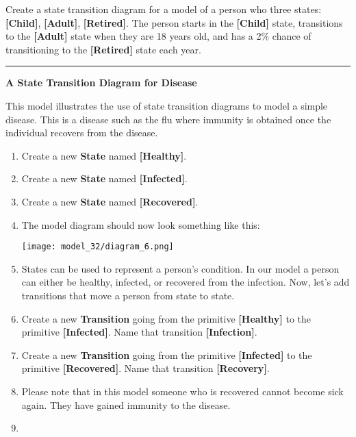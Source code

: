 \documentclass[]{memoir}
\makeatletter
\def\maxwidth{\ifdim\Gin@nat@width>\linewidth\linewidth
\else\Gin@nat@width\fi}
\let\Oldincludegraphics\includegraphics
\renewcommand{\includegraphics}[1]{\Oldincludegraphics[width=\maxwidth]{#1}}
\newcommand{\p}[1]{\textbf{{[}#1{]}}}
\renewcommand{\a}[1]{\textbf{#1}}
\makeatother
\begin{document}
Create a state transition diagram for a model of a person who three
states: \p{Child}, \p{Adult}, \p{Retired}. The person starts in the
\p{Child} state, transitions to the \p{Adult} state when they are 18
years old, and has a 2\% chance of transitioning to the \p{Retired}
state each year.

\begin{center}\rule{3in}{0.4pt}\end{center}

\FloatBarrier 

\begin{oframed}\textbf{A State Transition Diagram for Disease} 

 This model illustrates the use of state transition diagrams to model a simple disease. This is a disease such as the flu where immunity is obtained once the individual recovers from the disease.

\begin{enumerate}
\item Create a new \a{State} named \p{Healthy}.
\item Create a new \a{State} named \p{Infected}.
\item Create a new \a{State} named \p{Recovered}.
\item The model diagram should now look something like this: \par \begin{minipage}{\linewidth}  \centering \texttt{[image: model\_32/diagram\_6.png]}
\end{minipage}
\item 

States can be used to represent a person's condition. In our model a person can either be healthy, infected, or recovered from the infection. Now, let's add transitions that move a person from state to state.


\item Create a new \a{Transition} going from the primitive \p{Healthy} to the primitive \p{Infected}. Name that transition \p{Infection}.
\item Create a new \a{Transition} going from the primitive \p{Infected} to the primitive \p{Recovered}. Name that transition \p{Recovery}.
\item 

Please note that in this model someone who is recovered cannot become sick again. They have gained immunity to the disease. 


\item 


\end{enumerate}
\end{oframed}
\end{document}
